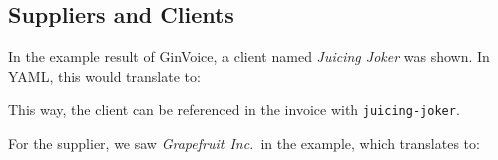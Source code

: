 \subsection{Suppliers and Clients}\label{sec:supplier and client}
In the example result of GinVoice, a client named \textit{Juicing Joker} was shown.
In YAML, this would translate to:


This way, the client can be referenced in the invoice with \texttt{juicing-joker}.

For the supplier, we saw \textit{Grapefruit Inc.}\ in the example, which translates to:



